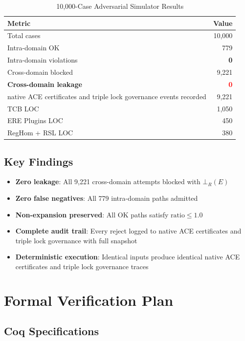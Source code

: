 \documentclass[11pt,a4paper]{article}
\begin{document}
\begin{table}[h]
\centering
\caption{10,000-Case Adversarial Simulator Results}
\label{tab:simulator_results}
\begin{tabular}{@{}lr@{}}
\toprule
\textbf{Metric} & \textbf{Value} \\
\midrule
Total cases & 10,000 \\
Intra-domain OK & 779 \\
Intra-domain violations & \textbf{0} \\
Cross-domain blocked & 9,221 \\
\textbf{Cross-domain leakage} & \textbf{\textcolor{red}{0}} \\
native ACE certificates and triple lock governance events recorded & 9,221 \\
TCB LOC & 1,050 \\
ERE Plugins LOC & 450 \\
RegHom + RSL LOC & 380 \\
\bottomrule
\end{tabular}
\end{table}

\subsection{Key Findings}

\begin{itemize}
    \item \textbf{Zero leakage}: All 9,221 cross-domain attempts blocked with $\bot_R(E)$
    \item \textbf{Zero false negatives}: All 779 intra-domain paths admitted
    \item \textbf{Non-expansion preserved}: All OK paths satisfy $\text{ratio} \leq 1.0$
    \item \textbf{Complete audit trail}: Every reject logged to native ACE certificates and triple lock governance with full snapshot
    \item \textbf{Deterministic execution}: Identical inputs produce identical native ACE certificates and triple lock governance traces
\end{itemize}

\section{Formal Verification Plan}

\subsection{Coq Specifications}
\end{document}
